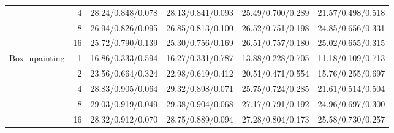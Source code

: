\begin{table}[t]
\begin{tabular}{lrcccc}
 & 4 & 28.24/0.848/0.078 & 28.13/0.841/0.093 & 25.49/0.700/0.289 & 21.57/0.498/0.518 \\
 & 8 & 26.94/0.826/0.095 & 26.85/0.813/0.100 & 26.52/0.751/0.198 & 24.85/0.656/0.331 \\
 & 16 & 25.72/0.790/0.139 & 25.30/0.756/0.169 & 26.51/0.757/0.180 & 25.02/0.655/0.315 \\
\midrule
Box inpainting & 1 & 16.86/0.333/0.594 & 16.27/0.331/0.787 & 13.88/0.228/0.705 & 11.18/0.109/0.713 \\
 & 2 & 23.56/0.664/0.324 & 22.98/0.619/0.412 & 20.51/0.471/0.554 & 15.76/0.255/0.697 \\
 & 4 & 28.83/0.905/0.064 & 29.32/0.898/0.071 & 25.75/0.724/0.285 & 21.61/0.514/0.504 \\
 & 8 & 29.03/0.919/0.049 & 29.38/0.904/0.068 & 27.17/0.791/0.192 & 24.96/0.697/0.300 \\
 & 16 & 28.32/0.912/0.070 & 28.75/0.889/0.094 & 27.28/0.804/0.173 & 25.58/0.730/0.257 \\
\bottomrule
\end{tabular}
\end{table}

